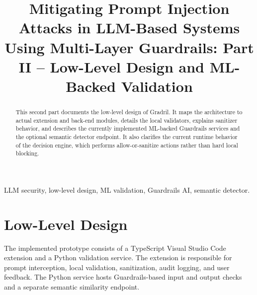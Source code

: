 \documentclass[journal]{IEEEtran}
\begin{document}
\title{Mitigating Prompt Injection Attacks in LLM-Based Systems Using Multi-Layer Guardrails: Part II -- Low-Level Design and ML-Backed Validation}

\author{
}

\maketitle
\setcounter{page}{6}

\begin{abstract}
This second part documents the low-level design of Gradril. It maps the architecture to actual extension and back-end modules, details the local validators, explains sanitizer behavior, and describes the currently implemented ML-backed Guardrails services and the optional semantic detector endpoint. It also clarifies the current runtime behavior of the decision engine, which performs allow-or-sanitize actions rather than hard local blocking.
\end{abstract}

\begin{IEEEkeywords}
LLM security, low-level design, ML validation, Guardrails AI, semantic detector.
\end{IEEEkeywords}

\section{Low-Level Design}
The implemented prototype consists of a TypeScript Visual Studio Code extension and a Python validation service. The extension is responsible for prompt interception, local validation, sanitization, audit logging, and user feedback. The Python service hosts Guardrails-based input and output checks and a separate semantic similarity endpoint.
\end{document}
